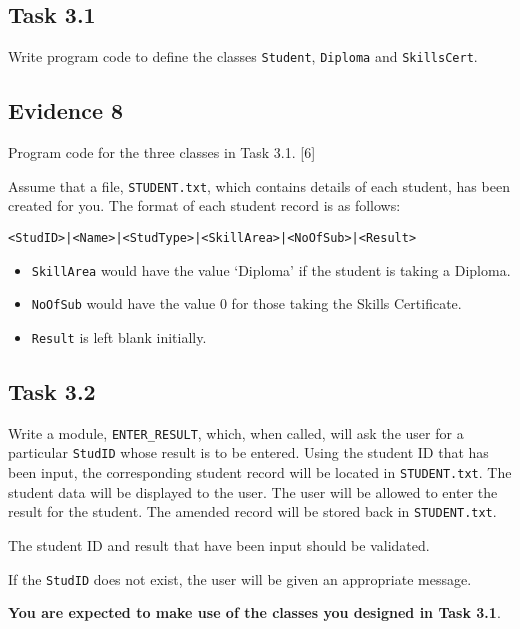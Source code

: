 \subsection*{Task 3.1 }

Write program code to define the classes \texttt{Student}, \texttt{Diploma}
and \texttt{SkillsCert}.

\subsection*{Evidence 8}

Program code for the three classes in Task 3.1. \hfill{}{[}6{]}

Assume that a file, \texttt{STUDENT.txt}, which contains details of
each student, has been created for you. The format of each student
record is as follows: 
\noindent \begin{center}
\texttt{<StudID>|<Name>|<StudType>|<SkillArea>|<NoOfSub>|<Result>}
\par\end{center}
\begin{itemize}
\item \texttt{SkillArea} would have the value \textquoteleft Diploma\textquoteright{}
if the student is taking a Diploma. 
\item \texttt{NoOfSub} would have the value 0 for those taking the Skills
Certificate.
\item \texttt{Result} is left blank initially. 
\end{itemize}

\subsection*{Task 3.2 }

Write a module, \texttt{ENTER\_RESULT}, which, when called, will ask
the user for a particular \texttt{StudID} whose result is to be entered.
Using the student ID that has been input, the corresponding student
record will be located in \texttt{STUDENT.txt}. The student data will
be displayed to the user. The user will be allowed to enter the result
for the student. The amended record will be stored back in \texttt{STUDENT.txt}. 

The student ID and result that have been input should be validated. 

If the \texttt{StudID} does not exist, the user will be given an appropriate
message.

\textbf{You are expected to make use of the classes you designed in
Task 3.1}.

